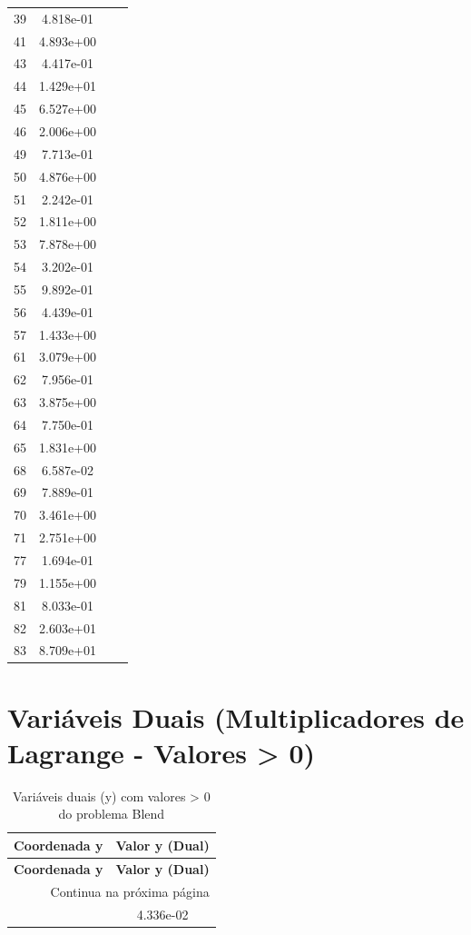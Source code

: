 \documentclass[12pt]{article}
\begin{document}
\begin{longtable}{@{}cccc@{}}
39 & 4.818e-01 &  &  \\
41 & 4.893e+00 &  &  \\
43 & 4.417e-01 &  &  \\
44 & 1.429e+01 &  &  \\
45 & 6.527e+00 &  &  \\
46 & 2.006e+00 &  &  \\
49 & 7.713e-01 &  &  \\
50 & 4.876e+00 &  &  \\
51 & 2.242e-01 &  &  \\
52 & 1.811e+00 &  &  \\
53 & 7.878e+00 &  &  \\
54 & 3.202e-01 &  &  \\
55 & 9.892e-01 &  &  \\
56 & 4.439e-01 &  &  \\
57 & 1.433e+00 &  &  \\
61 & 3.079e+00 &  &  \\
62 & 7.956e-01 &  &  \\
63 & 3.875e+00 &  &  \\
64 & 7.750e-01 &  &  \\
65 & 1.831e+00 &  &  \\
68 & 6.587e-02 &  &  \\
69 & 7.889e-01 &  &  \\
70 & 3.461e+00 &  &  \\
71 & 2.751e+00 &  &  \\
77 & 1.694e-01 &  &  \\
79 & 1.155e+00 &  &  \\
81 & 8.033e-01 &  &  \\
82 & 2.603e+01 &  &  \\
83 & 8.709e+01 &  &  \\

\bottomrule
\end{longtable}


\section{Variáveis Duais (Multiplicadores de Lagrange - Valores > 0)}

\begin{longtable}{@{}cc@{}}
\caption{Variáveis duais (y) com valores > 0 do problema Blend} \\
\toprule
\textbf{Coordenada y} & \textbf{Valor y (Dual)} \\
\midrule
\endfirsthead

\toprule
\textbf{Coordenada y} & \textbf{Valor y (Dual)} \\
\midrule
\endhead

\midrule \multicolumn{2}{r}{{Continua na próxima página}} \\ \midrule
\endfoot

\bottomrule
\endlastfoot
32 & 4.336e-02 \\

\bottomrule
\end{longtable}
\end{document}
